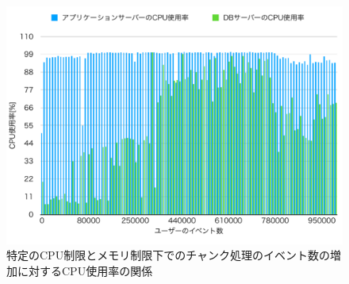 \documentclass[../../../../../main]{subfiles}
\begin{document}
    \begin{figure}[H]
        \centering
        \includegraphics[width=12cm]{graph}
        \caption{特定のCPU制限とメモリ制限下でのチャンク処理のイベント数の増加に対するCPU使用率の関係}
        \label{fig:stream-cpu-app_1_1024-db_1_1024}
    \end{figure}
\end{document}
